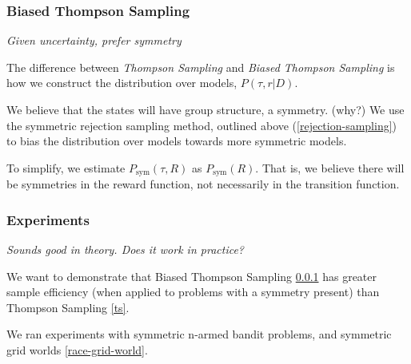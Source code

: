\subsubsection{Biased Thompson Sampling}\label{bts}

\begin{displayquote}
\textsl{Given uncertainty, prefer symmetry}
\end{displayquote}

The difference between \textit{Thompson Sampling} and \textit{Biased Thompson Sampling}
is how we construct the distribution over models, $P(\tau, r |D)$.

We believe that the states will have group structure, a symmetry. ({\color{red}why?})
We use the symmetric rejection sampling method, outlined above (\ref{rejection-sampling}) to bias the
distribution over models towards more symmetric models.

To simplify, we estimate $P_{\text{sym}}(\tau, R)$ as $P_{\text{sym}}(R)$. That is, we believe there will be symmetries in the reward function, not necessarily in the transition function.

%
%

\subsubsection{Experiments}

\begin{displayquote}
	\textsl{Sounds good in theory. Does it work in practice?}
\end{displayquote}

We want to demonstrate that Biased Thompson Sampling \ref{bts} has greater sample efficiency (when applied to problems with a symmetry present) than Thompson Sampling \ref{ts}.

We ran experiments with symmetric n-armed bandit problems, and symmetric grid worlds \ref{race-grid-world}\footnotemark.

